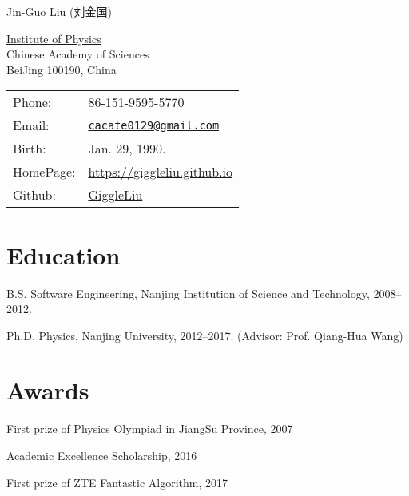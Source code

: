 \documentclass[letterpaper]{article}
\def\name{Jin-Guo Liu (刘金国)}
\renewenvironment{itemize}{
  \begin{list}{}{
    \setlength{\leftmargin}{1.5em}
  }
}{
  \end{list}
}
\begin{document}
{\huge \name}


\vspace{0.2in}

\begin{minipage}{0.45\linewidth}
    \href{http://english.iop.cas.cn/}{Institute of Physics}\\
    Chinese Academy of Sciences\\
    BeiJing 100190, China
\end{minipage}
\begin{minipage}{0.45\linewidth}
    \begin{tabular}{ll}
        Phone: & 86-151-9595-5770 \\
        Email: & \href{mailto:cacate0129@gmail.com}{\tt cacate0129@gmail.com} \\
        Birth: & Jan. 29, 1990.\\
        HomePage: & \href{https://giggleliu.github.io}{https://giggleliu.github.io}\\
        Github: & \href{https://github.com/GiggleLiu}{GiggleLiu}
    \end{tabular}
\end{minipage}



\section*{Education}

\begin{itemize}
    \item B.S. Software Engineering, Nanjing Institution of Science and Technology, 2008--2012.
    \item Ph.D. Physics, Nanjing University, 2012--2017. (Advisor: Prof. Qiang-Hua Wang)
\end{itemize}

\section*{Awards}
\begin{itemize}
    \item First prize of Physics Olympiad in JiangSu Province, 2007
    \item Academic Excellence Scholarship, 2016
    \item First prize of ZTE Fantastic Algorithm, 2017
\end{itemize}
\end{document}
